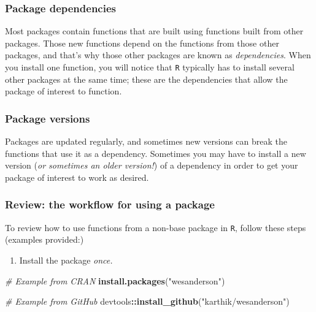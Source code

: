\documentclass[]{book}
\newenvironment{Shaded}{\begin{snugshade}}{\end{snugshade}}
\newcommand{\CommentTok}[1]{\textcolor[rgb]{0.56,0.35,0.01}{\textit{#1}}}
\newcommand{\KeywordTok}[1]{\textcolor[rgb]{0.13,0.29,0.53}{\textbf{#1}}}
\newcommand{\NormalTok}[1]{#1}
\newcommand{\OperatorTok}[1]{\textcolor[rgb]{0.81,0.36,0.00}{\textbf{#1}}}
\newcommand{\StringTok}[1]{\textcolor[rgb]{0.31,0.60,0.02}{#1}}
\providecommand{\tightlist}{%
  \setlength{\itemsep}{0pt}\setlength{\parskip}{0pt}}
\begin{document}
\hypertarget{package-dependencies}{%
\subsubsection*{Package dependencies}\label{package-dependencies}}

Most packages contain functions that are built using functions built from other packages. Those new functions depend on the functions from those other packages, and that's why those other packages are known as \emph{dependencies}. When you install one function, you will notice that \texttt{R} typically has to install several other packages at the same time; these are the dependencies that allow the package of interest to function.

\hypertarget{package-versions}{%
\subsubsection*{Package versions}\label{package-versions}}

Packages are updated regularly, and sometimes new versions can break the functions that use it as a dependency. Sometimes you may have to install a new version (\emph{or sometimes an older version!}) of a dependency in order to get your package of interest to work as desired.

\hypertarget{review-the-workflow-for-using-a-package}{%
\subsubsection*{Review: the workflow for using a package}\label{review-the-workflow-for-using-a-package}}

To review how to use functions from a non-base package in \texttt{R}, follow these steps (examples provided:)

\begin{enumerate}
\def\labelenumi{\arabic{enumi}.}
\tightlist
\item
  Install the package \emph{once.}
\end{enumerate}

\begin{Shaded}
\begin{Highlighting}[]
\CommentTok{# Example from CRAN}
\KeywordTok{install.packages}\NormalTok{(}\StringTok{"wesanderson"}\NormalTok{)}

\CommentTok{# Example from GitHub}
\NormalTok{devtools}\OperatorTok{::}\KeywordTok{install_github}\NormalTok{(}\StringTok{"karthik/wesanderson"}\NormalTok{)}
\end{Highlighting}
\end{Shaded}
\end{document}

